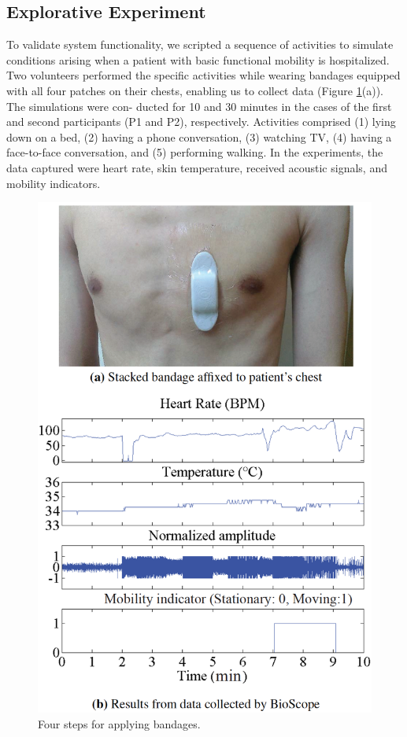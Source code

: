 \subsection{Explorative Experiment}
To validate system functionality, we scripted a sequence of activities to simulate conditions arising when a patient with basic functional mobility is hospitalized. Two volunteers performed the specific activities while wearing bandages equipped with all four patches on their chests, enabling us to collect data (Figure \ref{bio_exp_result}(a)). The simulations were con- ducted for 10 and 30 minutes in the cases of the first and second participants (P1 and P2), respectively. Activities comprised (1) lying down on a bed, (2) having a phone conversation, (3) watching TV, (4) having a face-to-face conversation, and (5) performing walking. In the experiments, the data captured were heart rate, skin temperature, received acoustic signals, and mobility indicators.


\begin{figure}[!ht]
\centering
\includegraphics[width=12cm]{image/bio_fig4}
\caption{Four steps for applying bandages.}
\label{bio_exp_result}
\end{figure}


